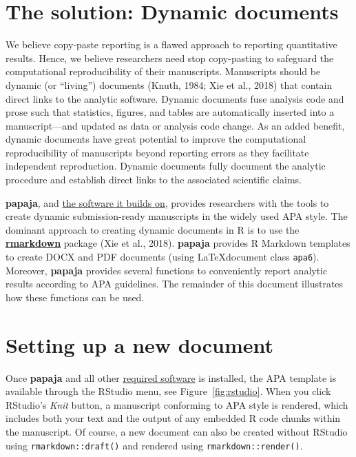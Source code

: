 \documentclass[
  english,
  ,man,floatsintext]{apa6}
\begin{document}
\section{The solution: Dynamic documents}\label{the-solution-dynamic-documents}

We believe copy-paste reporting is a flawed approach to reporting quantitative results.
Hence, we believe researchers need stop copy-pasting to safeguard the computational reproducibility of their manuscripts.
Manuscripts should be dynamic (or \enquote{living}) documents (Knuth, 1984; Xie et al., 2018) that contain direct links to the analytic software.
Dynamic documents fuse analysis code and prose such that statistics, figures, and tables are automatically inserted into a manuscript---and updated as data or analysis code change.
As an added benefit, dynamic documents have great potential to improve the computational reproducibility of manuscripts beyond reporting errors as they facilitate independent reproduction.
Dynamic documents fully document the analytic procedure and establish direct links to the associated scientific claims.

\textbf{papaja}, and \href{https://frederikaust.com/papaja_man/introduction.html\#document-compilation}{the software it builds on}, provides researchers with the tools to create dynamic submission-ready manuscripts in the widely used APA style.
The dominant approach to creating dynamic documents in R is to use the \href{https://rmarkdown.rstudio.com/}{\textbf{rmarkdown}} package (Xie et al., 2018).
\textbf{papaja} provides R Markdown templates to create DOCX and PDF documents (using \LaTeX document class \texttt{apa6}).
Moreover, \textbf{papaja} provides several functions to conveniently report analytic results according to APA guidelines.
The remainder of this document illustrates how these functions can be used.

\section{Setting up a new document}\label{setting-up-a-new-document}

Once \textbf{papaja} and all other \href{https://frederikaust.com/papaja_man/introduction.html\#software-requirements}{required software} is installed, the APA template is available through the RStudio menu, see Figure~\ref{fig:rstudio}.
When you click RStudio's \emph{Knit} button, a manuscript conforming to APA style is rendered, which includes both your text and the output of any embedded R code chunks within the manuscript.
Of course, a new document can also be created without RStudio using \texttt{rmarkdown::draft()} and rendered using \texttt{rmarkdown::render()}.
\end{document}
